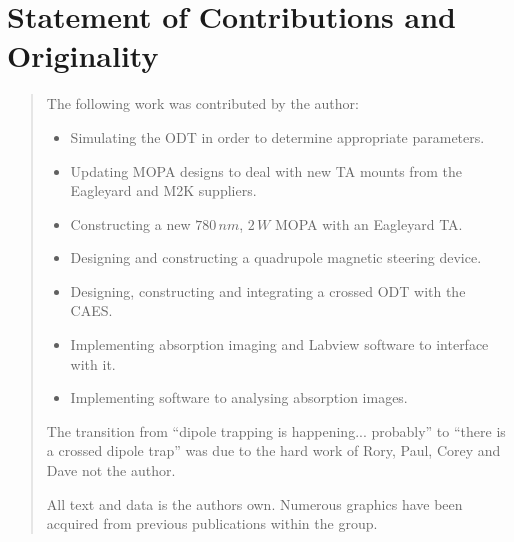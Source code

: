 \chapter*{\centering \LARGE Statement of Contributions and Originality}
\begin{quotation}
\noindent

The following work was contributed by the author:
\begin{itemize}
\item Simulating the ODT in order to determine appropriate parameters.
\item Updating MOPA designs to deal with new TA mounts from the Eagleyard and M2K suppliers.
\item Constructing a new $780\,\unit{nm}$, $2\,\unit{W}$ MOPA with an Eagleyard TA.
\item Designing and constructing a quadrupole magnetic steering device.
\item Designing, constructing and integrating a crossed ODT with the CAES.
\item Implementing absorption imaging and Labview software to interface with it.
\item Implementing software to analysing absorption images.
\end{itemize}

\vspace*{25mm}

The transition from ``dipole trapping is happening... probably'' to ``there is a crossed dipole trap'' was due to the hard work of Rory, Paul, Corey and Dave not the author.

\vspace*{25mm}

All text and data is the authors own. Numerous graphics have been acquired from previous publications within the group.
\end{quotation}
\clearpage
